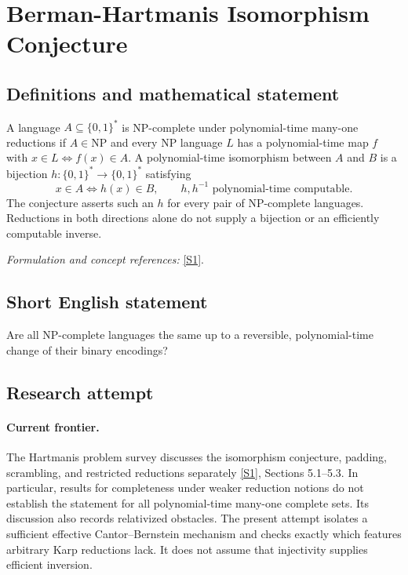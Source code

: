 \documentclass[11pt,a4paper]{article}
\newcommand{\sref}[2]{\hyperlink{source:#1:#2}{[S#2]}}
\newif\ifshowcatalogue
\newcommand{\cataloguescope}[1]{\ifshowcatalogue
 \paragraph{Exact scope in the supplied catalogue.}
 \begin{quote}\small #1\end{quote}\fi}
\numberwithin{equation}{section}
\begin{document}
\setcounter{section}{0}
\clearpage
\section*{\texorpdfstring{Berman-Hartmanis Isomorphism Conjecture}{Berman-Hartmanis Isomorphism Conjecture}}\label{30006769}
\subsection{Definitions and mathematical statement}
A language $A\subseteq\{0,1\}^*$ is NP-complete under polynomial-time many-one reductions if $A\in\mathrm{NP}$ and every NP language $L$ has a polynomial-time map $f$ with $x\in L\iff f(x)\in A$. A polynomial-time isomorphism between $A$ and $B$ is a bijection $h:\{0,1\}^*\to\{0,1\}^*$ satisfying
\[
 x\in A\iff h(x)\in B,
 \qquad h,h^{-1}\text{ polynomial-time computable}.
\]
The conjecture asserts such an $h$ for every pair of NP-complete languages. Reductions in both directions alone do not supply a bijection or an efficiently computable inverse.
\par\smallskip\textit{Formulation and concept references:} \sref{30006769}{1}.
\cataloguescope{Prove or disprove that for every two languages A and B complete for NP under polynomial-time many-one reductions, there is a bijection h on binary strings such that h(A)=B and both h and its inverse are computable in polynomial time.}
\subsection{Short English statement}
Are all NP-complete languages the same up to a reversible, polynomial-time change of their binary encodings?
\subsection{Research attempt}

\paragraph{Current frontier.}
The Hartmanis problem survey discusses the isomorphism conjecture, padding,
scrambling, and restricted reductions separately \sref{30006769}{1},
Sections 5.1--5.3. In particular, results for completeness under weaker
reduction notions do not establish the statement for all polynomial-time
many-one complete sets. Its discussion also records relativized obstacles.
The present attempt isolates a sufficient effective Cantor--Bernstein
mechanism and checks exactly which features arbitrary Karp reductions
lack. It does not assume that injectivity supplies efficient inversion.
\end{document}
